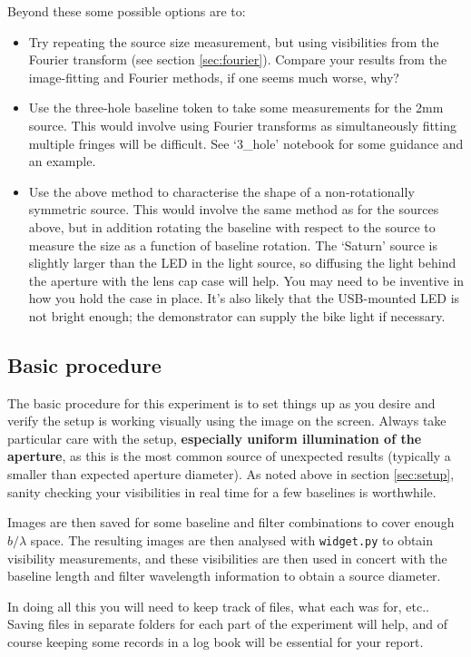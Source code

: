 \documentclass[11pt]{article}
\begin{document}
Beyond these some possible options are to:
\begin{itemize}
    \item Try repeating the source size measurement, but using visibilities from the Fourier transform (see section \ref{sec:fourier}). Compare your results from the image-fitting and Fourier methods, if one seems much worse, why?
    \item Use the three-hole baseline token to take some measurements for the 2mm source. This would involve using Fourier transforms as simultaneously fitting multiple fringes will be difficult. See `3\_hole' notebook for some guidance and an example.
    \item Use the above method to characterise the shape of a non-rotationally symmetric source. This would involve the same method as for the sources above, but in addition rotating the baseline with respect to the source to measure the size as a function of baseline rotation. The `Saturn' source is slightly larger than the LED in the light source, so diffusing the light behind the aperture with the lens cap case will help. You may need to be inventive in how you hold the case in place. It's also likely that the USB-mounted LED is not bright enough; the demonstrator can supply the bike light if necessary.
\end{itemize}

\subsection{Basic procedure}

The basic procedure for this experiment is to set things up as you desire and verify the setup is working visually using the image on the screen. Always take particular care with the setup, \textbf{especially uniform illumination of the aperture}, as this is the most common source of unexpected results (typically a smaller than expected aperture diameter). As noted above in section \ref{sec:setup}, sanity checking your visibilities in real time for a few baselines is worthwhile.

Images are then saved for some baseline and filter combinations to cover enough $b/\lambda$ space. The resulting images are then analysed with \texttt{widget.py} to obtain visibility measurements, and these visibilities are then used in concert with the baseline length and filter wavelength information to obtain a source diameter.

In doing all this you will need to keep track of files, what each was for, etc.. Saving files in separate folders for each part of the experiment will help, and of course keeping some records in a log book will be essential for your report.
\end{document}
